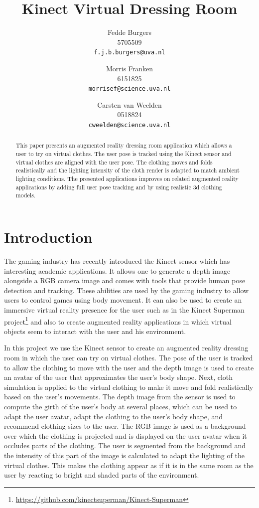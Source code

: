 \documentclass[twocolumn,a4paper]{article}
\title{Kinect Virtual Dressing Room}
\author{Fedde Burgers \\ 5705509 \\ \texttt{f.j.b.burgers@uva.nl} \and Morris Franken \\ 6151825 \\ \texttt{morrisef@science.uva.nl} \and Carsten van Weelden \\ 0518824 \\ \texttt{cweelden@science.uva.nl}}
\begin{document}
\maketitle

\begin{abstract}
This paper presents an augmented reality dressing room application which allows a user to try on virtual clothes. The user pose is tracked using the Kinect sensor and virtual clothes are aligned with the user pose. The clothing moves and folds realistically and the lighting intensity of the cloth render is adapted to match ambient lighting conditions. The presented applications improves on related augmented reality applications by adding full user pose tracking and by using realistic 3d clothing models. 
\end{abstract}

\par{}

\section{Introduction}
\label{sec:introduction}

The gaming industry has recently introduced the Kinect sensor which has interesting academic applications. It allows one to generate a depth image alongside a RGB camera image and comes with tools that provide human pose detection and tracking. These abilities are used by the gaming industry to allow users to control games using body movement. It can also be used to create an immersive virtual reality presence for the user such as in the Kinect Superman project\footnote{\url{https://github.com/kinectsuperman/Kinect-Superman}} and also to create augmented reality applications in which virtual objects seem to interact with the user and his environment.

In this project we use the Kinect sensor to create an augmented reality dressing room in which the user can try on virtual clothes. The pose of the user is tracked to allow the clothing to move with the user and the depth image is used to create an avatar of the user that approximates the user's body shape. Next, cloth simulation is applied to the virtual clothing to make it move and fold realistically based on the user's movements. The depth image from the sensor is used to compute the girth of the user's body at several places, which can be used to adapt the user avatar, adapt the clothing to the user's body shape, and recommend clothing sizes to the user. The RGB image is used as a background over which the clothing is projected and is displayed on the user avatar when it occludes parts of the clothing. The user is segmented from the background and the intensity of this part of the image is calculated to adapt the lighting of the virtual clothes. This makes the clothing appear as if it is in the same room as the user by reacting to bright and shaded parts of the environment.
\end{document}
